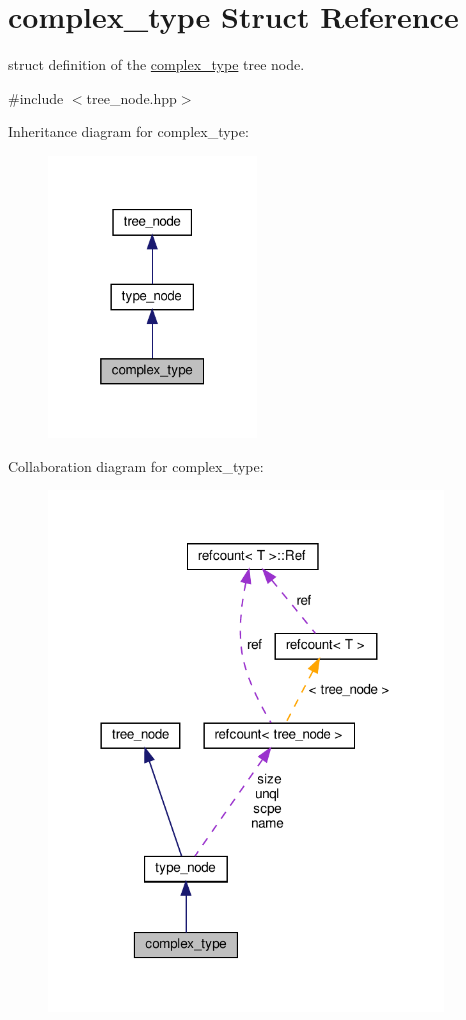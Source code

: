 \hypertarget{structcomplex__type}{}\section{complex\+\_\+type Struct Reference}
\label{structcomplex__type}


struct definition of the \hyperlink{structcomplex__type}{complex\+\_\+type} tree node.  




{\ttfamily \#include $<$tree\+\_\+node.\+hpp$>$}



Inheritance diagram for complex\+\_\+type\+:
\nopagebreak
\begin{figure}[H]
\begin{center}
\leavevmode
\includegraphics[width=157pt]{df/d19/structcomplex__type__inherit__graph}
\end{center}
\end{figure}


Collaboration diagram for complex\+\_\+type\+:
\nopagebreak
\begin{figure}[H]
\begin{center}
\leavevmode
\includegraphics[width=297pt]{df/dd3/structcomplex__type__coll__graph}
\end{center}
\end{figure}
